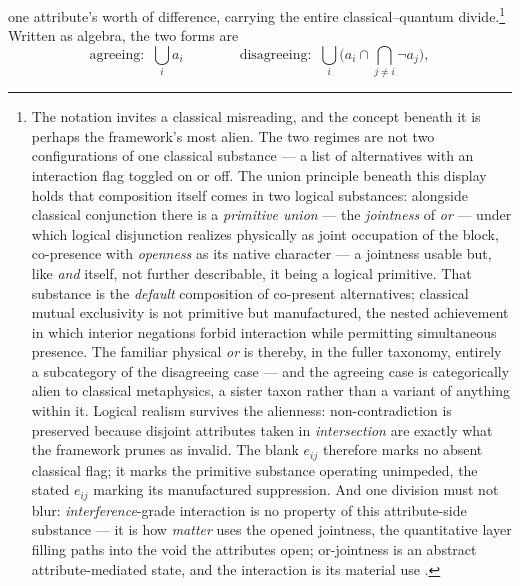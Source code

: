 \documentclass[11pt]{article}
\theoremstyle{definition}
\begin{document}
one attribute's worth of difference, carrying the entire classical--quantum divide.\footnote{The notation invites a classical misreading, and the concept beneath it is perhaps the framework's most alien. The two regimes are not two configurations of one classical substance --- a list of alternatives with an interaction flag toggled on or off. The union principle beneath this display holds that composition itself comes in two logical substances: alongside classical conjunction there is a \emph{primitive union} --- the \emph{jointness} of \emph{or} --- under which logical disjunction realizes physically as joint occupation of the block, co-presence with \emph{openness} as its native character --- a jointness usable but, like \emph{and} itself, not further describable, it being a logical primitive. That substance is the \emph{default} composition of co-present alternatives; classical mutual exclusivity is not primitive but manufactured, the nested achievement in which interior negations forbid interaction while permitting simultaneous presence. The familiar physical \emph{or} is thereby, in the fuller taxonomy, entirely a subcategory of the disagreeing case --- and the agreeing case is categorically alien to classical metaphysics, a sister taxon rather than a variant of anything within it. Logical realism survives the alienness: non-contradiction is preserved because disjoint attributes taken in \emph{intersection} are exactly what the framework prunes as invalid. The blank $e_{ij}$ therefore marks no absent classical flag; it marks the primitive substance operating unimpeded, the stated $e_{ij}$ marking its manufactured suppression. And one division must not blur: \emph{interference}-grade interaction is no property of this attribute-side substance --- it is how \emph{matter} uses the opened jointness, the quantitative layer filling paths into the void the attributes open; or-jointness is an abstract attribute-mediated state, and the interaction is its material use \cite{Aethus}.} Written as algebra, the two forms are
\begin{equation*}
\text{agreeing:}\;\; \bigcup_i a_i \qquad\qquad \text{disagreeing:}\;\; \bigcup_i \Big( a_i \cap \bigcap_{j \neq i} \neg a_j \Big),
\end{equation*}
\end{document}
